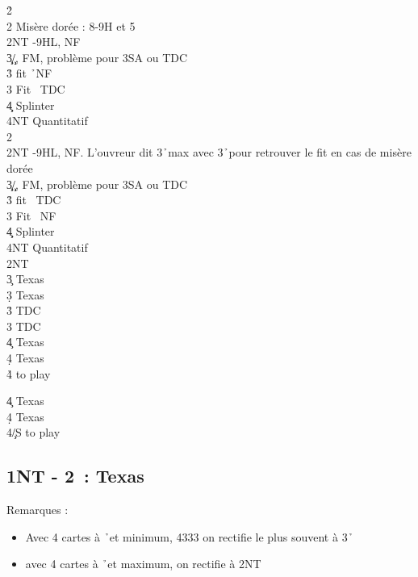 \documentclass[a4paper]{article}
\begin{document}
\begin{bidtable}
2\h\+\\
2\s \> Misère dorée : 8-9H et 5\s \\
2NT -9HL, NF\\
3\c\d {}\c /\d , FM, problème pour 3SA ou TDC\\
3\h \> fit \h\ NF\\
3\s \> Fit \s\ TDC\\
4\c\d \> Splinter\\
4NT \> Quantitatif\-\\
2\s\+\\
2NT -9HL, NF. L'ouvreur dit 3\h\ max avec 3\h\ pour retrouver le fit en cas de misère dorée\\
3\c\d {}\c /\d , FM, problème pour 3SA ou TDC\\
3\h \> fit \s\ TDC\\
3\s \> Fit \s\ NF\\
4\c\d \> Splinter\\
4NT \> Quantitatif\-\\
2NT\+\\
3\c \> Texas \h \\
3\d \> Texas \s \\
3\h \> TDC\\
3\s \> TDC\\
4\c \> Texas \h \\
4\d \> Texas \s \\
4\h\s \> to play\-
\end{bidtable}

\begin{bidtable}
4\c \> Texas \h \\
4\d \> Texas \s \\
4\c/S \> to play
\end{bidtable}

\subsection{1NT - 2\pdfd\ : Texas \pdfh}

Remarques :

\begin{itemize}
\item Avec 4 cartes à \h\ et minimum, 4333 on rectifie le plus souvent à 3\h\ 

\item avec 4 cartes à \h\ et maximum, on rectifie à 2NT

\end{itemize}
\end{document}
